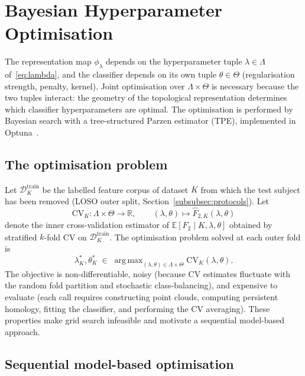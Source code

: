 \documentclass[onluarkali,ingilizce,yukseklisans,karton,LisansustuEgitim]{itutez}
\DeclareMathOperator*{\argmax}{arg\,max}
\providecommand{\R}{\mathbb{R}}
\providecommand{\E}{\mathbb{E}}
\providecommand{\1}{\mathbf{1}}
\begin{document}
\section{Bayesian Hyperparameter Optimisation}
\label{subsec:bayesopt}

The representation map $\phi_\lambda$ depends on the hyperparameter tuple $\lambda\in\Lambda$ of~\eqref{eq:lambda}, and the classifier depends on its own tuple $\theta\in\Theta$ (regularisation strength, penalty, kernel). Joint optimisation over $\Lambda\times\Theta$ is necessary because the two tuples interact: the geometry of the topological representation determines which classifier hyperparameters are optimal. The optimisation is performed by Bayesian search with a tree-structured Parzen estimator (TPE), implemented in Optuna~\parencite{optuna}.

\subsection{The optimisation problem}
\label{subsubsec:opt-problem}

Let $\mathcal{D}^{\mathrm{train}}_K$ be the labelled feature corpus of dataset $K$ from which the test subject has been removed (LOSO outer split, Section~\ref{subsubsec:protocols}). Let
\[
  \mathrm{CV}_K\colon\Lambda\times\Theta\longrightarrow\R,
  \qquad
  (\lambda,\theta)\longmapsto\widehat{F}_{2,K}(\lambda,\theta)
\]
denote the inner cross-validation estimator of $\E[F_2\mid K,\lambda,\theta]$ obtained by stratified $k$-fold CV on $\mathcal{D}^{\mathrm{train}}_K$. The optimisation problem solved at each outer fold is
\begin{equation}
  \lambda^*_K,\theta^*_K\;\in\;\argmax_{(\lambda,\theta)\in\Lambda\times\Theta}\mathrm{CV}_K(\lambda,\theta).
  \label{eq:bayes-objective}
\end{equation}
The objective is non-differentiable, noisy (because CV estimates fluctuate with the random fold partition and stochastic class-balancing), and expensive to evaluate (each call requires constructing point clouds, computing persistent homology, fitting the classifier, and performing the CV averaging). These properties make grid search infeasible and motivate a sequential model-based approach.

\subsection{Sequential model-based optimisation}
\label{subsubsec:smbo}
\end{document}
